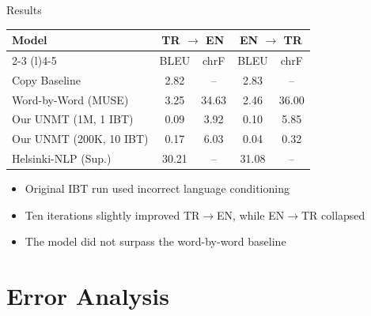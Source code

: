 \documentclass[aspectratio=169]{beamer}
\begin{document}
\begin{frame}{Results}
  \begin{table}
    \centering
    \begin{tabular}{@{}lcccc@{}}
      \toprule
      \textbf{Model} & \multicolumn{2}{c}{\textbf{TR $\rightarrow$ EN}} & \multicolumn{2}{c}{\textbf{EN $\rightarrow$ TR}} \\
      \cmidrule(lr){2-3} \cmidrule(l){4-5}
       & BLEU & chrF & BLEU & chrF \\ \midrule
      Copy Baseline         & 2.82 & --    & 2.83  & --    \\
      Word-by-Word (MUSE)   & 3.25 & 34.63 & 2.46  & 36.00 \\
      Our UNMT (1M, 1 IBT)          & 0.09 & 3.92 & 0.10 & 5.85 \\
      Our UNMT (200K, 10 IBT)       & 0.17 & 6.03 & 0.04 & 0.32 \\
      Helsinki-NLP (Sup.)   & 30.21 & --   & 31.08 & --    \\ \bottomrule
    \end{tabular}
  \end{table}
  \vfill
  \begin{itemize}
    \item Original IBT run used incorrect language conditioning
    \item Ten iterations slightly improved TR$\rightarrow$EN, while EN$\rightarrow$TR collapsed
    \item The model did not surpass the word-by-word baseline
  \end{itemize}
\end{frame}

\section{Error Analysis}
\end{document}
